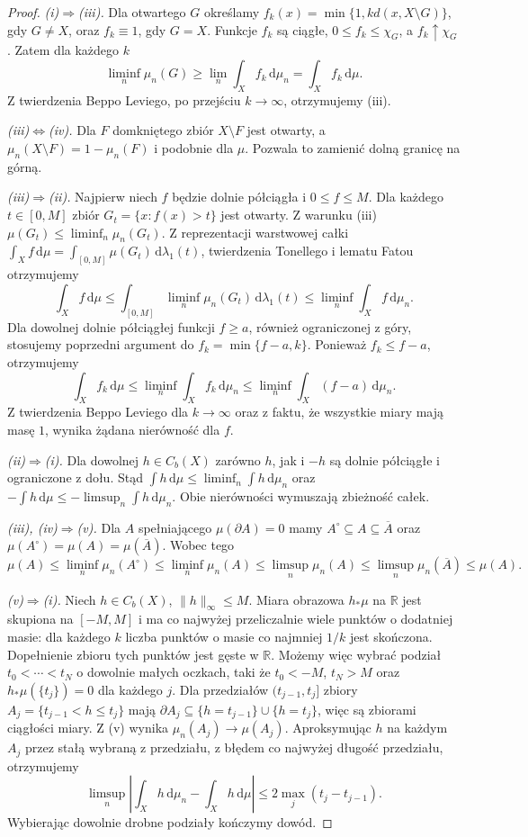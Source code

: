 \begin{proof}
\emph{(i)$\Rightarrow$(iii).}
Dla otwartego $G$ określamy
$f_k(x)=\min\{1,kd(x,X\setminus G)\}$, gdy
$G\neq X$, oraz $f_k\equiv1$, gdy $G=X$.
Funkcje $f_k$ są ciągłe, $0\le f_k\le\chi_G$,
a $f_k\uparrow\chi_G$. Zatem dla każdego $k$
\[
\liminf_n\mu_n(G)\ge\lim_n\int_X f_k\,\mathrm d\mu_n
=\int_X f_k\,\mathrm d\mu.
\]
Z twierdzenia Beppo Leviego, po przejściu $k\to\infty$,
otrzymujemy (iii).

\emph{(iii)$\Leftrightarrow$(iv).}
Dla $F$ domkniętego zbiór $X\setminus F$ jest otwarty,
a $\mu_n(X\setminus F)=1-\mu_n(F)$ i podobnie
dla $\mu$. Pozwala to zamienić dolną granicę na górną.

\emph{(iii)$\Rightarrow$(ii).}
Najpierw niech $f$ będzie dolnie półciągła i
$0\le f\le M$. Dla każdego $t\in[0,M]$ zbiór
$G_t=\{x:f(x)>t\}$ jest otwarty. Z warunku (iii)
$\mu(G_t)\le\liminf_n\mu_n(G_t)$.
Z reprezentacji warstwowej całki
$\int_X f\,\mathrm d\mu=\int_{[0,M]}\mu(G_t)
\,\mathrm d\lambda_1(t)$, twierdzenia Tonellego
i lematu Fatou otrzymujemy
\[
\int_X f\,\mathrm d\mu
\le\int_{[0,M]}\liminf_n\mu_n(G_t)\,\mathrm d\lambda_1(t)
\le\liminf_n\int_Xf\,\mathrm d\mu_n.
\]
Dla dowolnej dolnie półciągłej funkcji $f\ge a$,
również ograniczonej z góry, stosujemy poprzedni argument
do $f_k=\min\{f-a,k\}$. Ponieważ $f_k\le f-a$,
otrzymujemy
\[
 \int_X f_k\,\mathrm d\mu
 \le\liminf_n\int_X f_k\,\mathrm d\mu_n
 \le\liminf_n\int_X(f-a)\,\mathrm d\mu_n.
\]
Z twierdzenia Beppo Leviego dla $k\to\infty$
oraz z faktu, że wszystkie miary mają masę $1$,
wynika żądana nierówność dla $f$.

\emph{(ii)$\Rightarrow$(i).}
Dla dowolnej $h\in C_b(X)$ zarówno $h$, jak i $-h$
są dolnie półciągłe i ograniczone z dołu. Stąd
$\int h\,\mathrm d\mu\le\liminf_n\int h\,\mathrm d\mu_n$
oraz $-\int h\,\mathrm d\mu\le
-\limsup_n\int h\,\mathrm d\mu_n$.
Obie nierówności wymuszają zbieżność całek.

\emph{(iii), (iv)$\Rightarrow$(v).}
Dla $A$ spełniającego $\mu(\partial A)=0$ mamy
$A^\circ\subseteq A\subseteq\overline A$ oraz
$\mu(A^\circ)=\mu(A)=\mu(\overline A)$.
Wobec tego
\[
\mu(A)\le\liminf_n\mu_n(A^\circ)
\le\liminf_n\mu_n(A)
\le\limsup_n\mu_n(A)
\le\limsup_n\mu_n(\overline A)\le\mu(A).
\]

\emph{(v)$\Rightarrow$(i).}
Niech $h\in C_b(X)$, $\|h\|_\infty\le M$.
Miara obrazowa $h_*\mu$ na $\mathbb R$ jest
skupiona na $[-M,M]$ i ma co najwyżej przeliczalnie wiele
punktów o dodatniej masie: dla każdego $k$ liczba
punktów o masie co najmniej $1/k$ jest skończona.
Dopełnienie zbioru tych punktów jest gęste w $\mathbb R$.
Możemy więc wybrać podział $t_0<\cdots<t_N$
o dowolnie małych oczkach, taki że $t_0<-M$,
$t_N>M$ oraz $h_*\mu(\{t_j\})=0$ dla każdego $j$. Dla przedziałów $(t_{j-1},t_j]$
zbiory $A_j=\{t_{j-1}<h\le t_j\}$ mają
$\partial A_j\subseteq\{h=t_{j-1}\}\cup\{h=t_j\}$,
więc są zbiorami ciągłości miary. Z (v) wynika
$\mu_n(A_j)\to\mu(A_j)$. Aproksymując $h$
na każdym $A_j$ przez stałą wybraną z przedziału,
z błędem co najwyżej długość przedziału, otrzymujemy
\[
 \limsup_n\left|\int_Xh\,\mathrm d\mu_n-
 \int_Xh\,\mathrm d\mu\right|
 \le2\max_j(t_j-t_{j-1}).
\]
Wybierając dowolnie drobne podziały kończymy dowód.
\end{proof}

